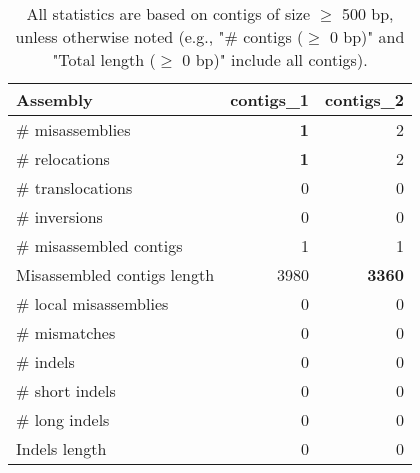 \documentclass[12pt,a4paper]{article}
\begin{document}
\begin{table}[ht]
\begin{center}
\caption{All statistics are based on contigs of size $\geq$ 500 bp, unless otherwise noted (e.g., "\# contigs ($\geq$ 0 bp)" and "Total length ($\geq$ 0 bp)" include all contigs).}
\begin{tabular}{|l*{2}{|r}|}
\hline
Assembly & contigs\_1 & contigs\_2 \\ \hline
\# misassemblies & {\bf 1} & 2 \\ \hline
\hspace{5mm}\# relocations & {\bf 1} & 2 \\ \hline
\hspace{5mm}\# translocations & 0 & 0 \\ \hline
\hspace{5mm}\# inversions & 0 & 0 \\ \hline
\# misassembled contigs & 1 & 1 \\ \hline
Misassembled contigs length & 3980 & {\bf 3360} \\ \hline
\# local misassemblies & 0 & 0 \\ \hline
\# mismatches & 0 & 0 \\ \hline
\# indels & 0 & 0 \\ \hline
\hspace{5mm}\# short indels & 0 & 0 \\ \hline
\hspace{5mm}\# long indels & 0 & 0 \\ \hline
Indels length & 0 & 0 \\ \hline
\end{tabular}
\end{center}
\end{table}
\end{document}
